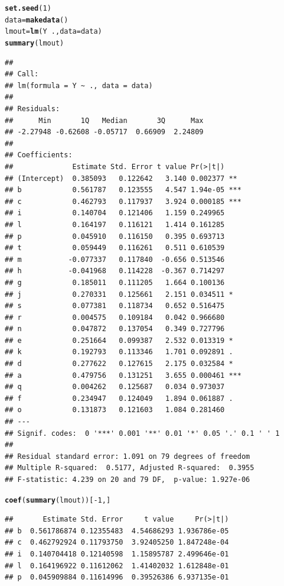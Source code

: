 \documentclass[11pt]{article}\usepackage[]{graphicx}\usepackage[]{color}
\makeatletter
\newcommand{\hlnum}[1]{\textcolor[rgb]{0.686,0.059,0.569}{#1}}%
\newcommand{\hlopt}[1]{\textcolor[rgb]{0,0,0}{#1}}%
\newcommand{\hlstd}[1]{\textcolor[rgb]{0.345,0.345,0.345}{#1}}%
\newcommand{\hlkwb}[1]{\textcolor[rgb]{0.69,0.353,0.396}{#1}}%
\newcommand{\hlkwc}[1]{\textcolor[rgb]{0.333,0.667,0.333}{#1}}%
\newcommand{\hlkwd}[1]{\textcolor[rgb]{0.737,0.353,0.396}{\textbf{#1}}}%
\newenvironment{kframe}{%
 \def\at@end@of@kframe{}%
 \ifinner\ifhmode%
  \def\at@end@of@kframe{\end{minipage}}%
  \begin{minipage}{\columnwidth}%
 \fi\fi%
 \def\FrameCommand##1{\hskip\@totalleftmargin \hskip-\fboxsep
 \colorbox{shadecolor}{##1}\hskip-\fboxsep
     \hskip-\linewidth \hskip-\@totalleftmargin \hskip\columnwidth}%
 \MakeFramed {\advance\hsize-\width
   \@totalleftmargin\z@ \linewidth\hsize
   \@setminipage}}%
 {\par\unskip\endMakeFramed%
 \at@end@of@kframe}
\newenvironment{knitrout}{}{} %
\makeatother
\begin{document}
\begin{knitrout}
\begin{kframe}
\begin{alltt}
\hlkwd{set.seed}\hlstd{(}\hlnum{1}\hlstd{)}
\hlstd{data}\hlkwb{=}\hlkwd{makedata}\hlstd{()}
\hlstd{lmout}\hlkwb{=}\hlkwd{lm}\hlstd{(Y}\hlopt{~}\hlstd{.,}\hlkwc{data}\hlstd{=data)}
\hlkwd{summary}\hlstd{(lmout)}
\end{alltt}
\begin{verbatim}
## 
## Call:
## lm(formula = Y ~ ., data = data)
## 
## Residuals:
##      Min       1Q   Median       3Q      Max 
## -2.27948 -0.62608 -0.05717  0.66909  2.24809 
## 
## Coefficients:
##              Estimate Std. Error t value Pr(>|t|)    
## (Intercept)  0.385093   0.122642   3.140 0.002377 ** 
## b            0.561787   0.123555   4.547 1.94e-05 ***
## c            0.462793   0.117937   3.924 0.000185 ***
## i            0.140704   0.121406   1.159 0.249965    
## l            0.164197   0.116121   1.414 0.161285    
## p            0.045910   0.116150   0.395 0.693713    
## t            0.059449   0.116261   0.511 0.610539    
## m           -0.077337   0.117840  -0.656 0.513546    
## h           -0.041968   0.114228  -0.367 0.714297    
## g            0.185011   0.111205   1.664 0.100136    
## j            0.270331   0.125661   2.151 0.034511 *  
## s            0.077381   0.118734   0.652 0.516475    
## r            0.004575   0.109184   0.042 0.966680    
## n            0.047872   0.137054   0.349 0.727796    
## e            0.251664   0.099387   2.532 0.013319 *  
## k            0.192793   0.113346   1.701 0.092891 .  
## d            0.277622   0.127615   2.175 0.032584 *  
## a            0.479756   0.131251   3.655 0.000461 ***
## q            0.004262   0.125687   0.034 0.973037    
## f            0.234947   0.124049   1.894 0.061887 .  
## o            0.131873   0.121603   1.084 0.281460    
## ---
## Signif. codes:  0 '***' 0.001 '**' 0.01 '*' 0.05 '.' 0.1 ' ' 1
## 
## Residual standard error: 1.091 on 79 degrees of freedom
## Multiple R-squared:  0.5177,	Adjusted R-squared:  0.3955 
## F-statistic: 4.239 on 20 and 79 DF,  p-value: 1.927e-06
\end{verbatim}
\begin{alltt}
\hlkwd{coef}\hlstd{(}\hlkwd{summary}\hlstd{(lmout))[}\hlopt{-}\hlnum{1}\hlstd{,]}
\end{alltt}
\begin{verbatim}
##       Estimate Std. Error     t value     Pr(>|t|)
## b  0.561786874 0.12355483  4.54686293 1.936786e-05
## c  0.462792924 0.11793750  3.92405250 1.847248e-04
## i  0.140704418 0.12140598  1.15895787 2.499646e-01
## l  0.164196922 0.11612062  1.41402032 1.612848e-01
## p  0.045909884 0.11614996  0.39526386 6.937135e-01

\end{verbatim}
\end{kframe}
\end{knitrout}
\end{document}
